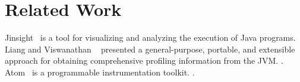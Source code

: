 \section{Related Work}
\label{sec:relatedwork}
Jinsight~\cite{JINSIGHT} is a tool for visualizing and analyzing the execution of Java programs.  
Liang and Viswanathan ~\cite{liang99:comprehensive} presented a general-purpose, portable, and extensible approach for obtaining comprehensive profiling information from the JVM.  .
Atom~\cite{srivastava94:atom} is a programmable instrumentation toolkit.  .